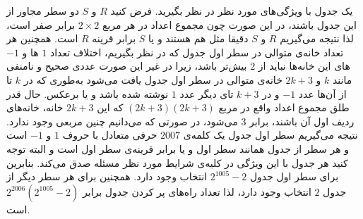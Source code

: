 \p
یک جدول با ویژگی‌های مورد نظر در نظر بگیرید. فرض کنید
$R$
و
$S$
دو سطر مجاور از این جدول باشند، در این صورت چون مجموع اعداد در هر مربع
$2 \times 2$
برابر صفر است، لذا نتیجه می‌گیریم
$R$
و
$S$
دقیقا مثل هم هستند و یا
$S$
برابر قرینه
$R$
است. همچنین هر تعداد خانه‌ی متوالی در سطر اول جدول که در نظر بگیریم، اختلاف تعداد
$1$
ها و
$-1$
های این خانه‌ها نباید از
$2$
بیش‌تر باشد، زیرا در غیر این صورت عددی صحیح و نامنفی مانند
$k$
و
$2k + 3$
خانه‌ی متوالی در سطر اول جدول یافت می‌شود به‌طوری که در
$k$
تا از آن‌ها عدد
$-1$
و در
$k + 3$
تای دیگر عدد
$1$
نوشته شده باشد و یا برعکس. حال قدر طلق مجموع اعداد واقع در مربع
$(2k + 3)(2k + 3)$
که این
$2k + 3$
خانه، خانه‌های ردیف اول آن باشند، برابر
$3$
می‌شود، در صورتی که می‌دانیم چنین مربعی وجود ندارد. نتیجه می‌گیریم سطر اول جدول یک کلمه‌ی
$2007$
حرفی متعادل با حروف
$1$
و
$-1$
است و هر سطر از جدول همانند سطر اول و یا برابر قرینه‌ی سطر اول است و البته توجه کنید هر جدول با این ویژگی در کلیه‌ی شرایط مورد نظر مسئله صدق می‌کند. بنابرین برای سطر اول جدول
$2^{1005} - 2$
انتخاب وجود دارد. همچنین برای هر سطر دیگر از جدول
$2$
انتخاب وجود دارد، لذا تعداد راه‌های پر کردن جدول برابر
$2^{2006}(2^{1005} - 2)$
است.